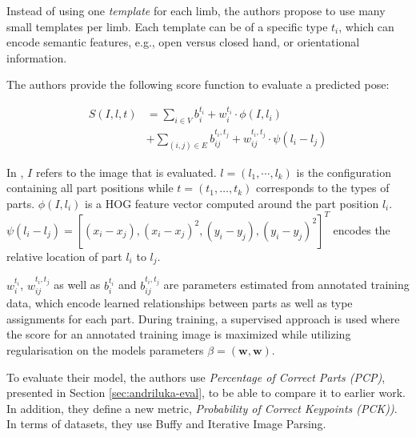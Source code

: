 Instead of using one \textit{template} for each limb, the authors propose to use many small templates per limb.
Each template can be of a specific type $t_i$, which can encode semantic features, e.g., open versus closed hand, or orientational information.

The authors provide the following score function to evaluate a predicted pose:

\begin{equation}
    \label{eq:yang-score}
    \begin{split}
        S(I, l, t) 
        &= \sum_{i \in V} b_i^{t_i} + w_i^{t_i} \cdot \phi(I, l_i) \\
        &+ \sum_{(i,j) \in E} b_{ij}^{t_i, t_j} + w_{ij}^{t_i, t_j} \cdot \psi(l_i - l_j)
    \end{split}
\end{equation}

In , $I$ refers to the image that is evaluated.
$l = (l_1, \cdots, l_k)$ is the configuration containing all part positions while $t = (t_1, \dots, t_k)$ corresponds to the types of parts.
$\phi(I, l_i)$ is a HOG feature vector \cite{dalal_histograms_2005} computed around the part position $l_i$.
$\psi(l_i - l_j) = [(x_i - x_j), (x_i - x_j)^2, (y_i - y_j), (y_i - y_j)^2]^T$ encodes the relative location of part $l_i$ to $l_j$.

$w_i^{t_i}$, $w_{ij}^{t_i, t_j}$ as well as $b_i^{t_i}$ and $b_{ij}^{t_i, t_j}$ are parameters estimated from annotated training data, which encode learned relationships between parts as well as type assignments for each part.
During training, a supervised approach is used where the score for an annotated training image is maximized while utilizing regularisation on the models parameters $\beta = (\bm{w}, \bm{w})$.


To evaluate their model, the authors use \textit{Percentage of Correct Parts (PCP)}, presented in Section \ref{sec:andriluka-eval}, to be able to compare it to earlier work.
In addition, they define a new metric, \textit{Probability of Correct Keypoints (PCK))}.
In terms of datasets, they use Buffy and Iterative Image Parsing. 

